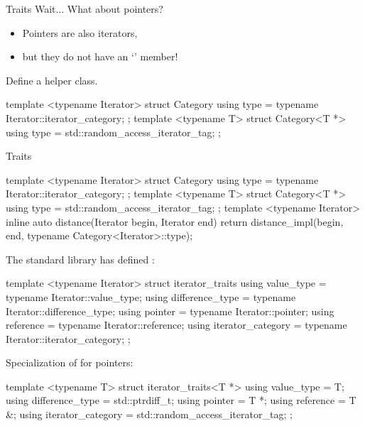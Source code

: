 \begin{frame}[fragile]{Traits}
    Wait... What about pointers?
    \begin{itemize}
        \item Pointers are also iterators,
        \item but they do not have an `' member!
    \end{itemize}
    \pause
    Define a helper class.
    \begin{cpp}
template <typename Iterator>
struct Category {
  using type = typename Iterator::iterator_category;
};
template <typename T>
struct Category<T *> {
  using type = std::random_access_iterator_tag;
};
    \end{cpp}
\end{frame}

\begin{frame}[fragile]{Traits}
    \begin{cpp}
template <typename Iterator>
struct Category {
  using type = typename Iterator::iterator_category;
};
template <typename T>
struct Category<T *> {
  using type = std::random_access_iterator_tag;
};
template <typename Iterator>
inline auto distance(Iterator begin, Iterator end) {
  return distance_impl(begin, end,
                    typename Category<Iterator>::type{});
}
    \end{cpp}
\end{frame}

\begin{frame}[fragile]{}
    The standard library has defined :
    \begin{cpp}
template <typename Iterator>
struct iterator_traits {
  using value_type = typename Iterator::value_type;
  using difference_type
      = typename Iterator::difference_type;
  using pointer = typename Iterator::pointer;
  using reference = typename Iterator::reference;
  using iterator_category
      = typename Iterator::iterator_category;
};
    \end{cpp}
\end{frame}

\begin{frame}[fragile]{}
    Specialization of  for pointers:
    \begin{cpp}
template <typename T>
struct iterator_traits<T *> {
  using value_type = T;
  using difference_type = std::ptrdiff_t;
  using pointer = T *;
  using reference = T &;
  using iterator_category
      = std::random_access_iterator_tag;
};
    \end{cpp}
\end{frame}

